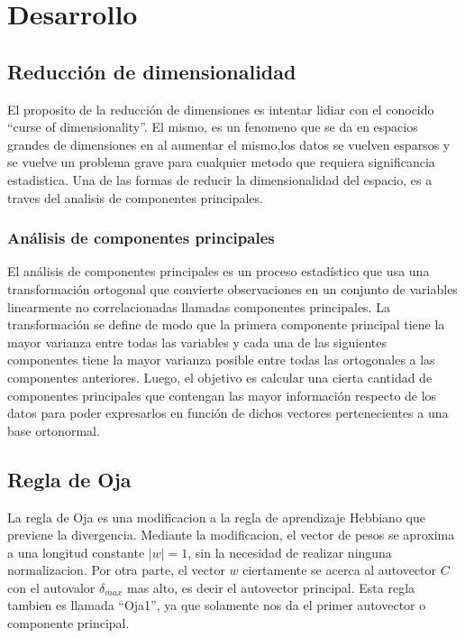 \documentclass[informe.tex]{subfiles}
\begin{document}
  
  \section{Desarrollo}
    \subsection{Reducción de dimensionalidad}
	El proposito de la reducción de dimensiones es intentar lidiar con el conocido ``curse of dimensionality''. El mismo, es un fenomeno que se da en espacios grandes de dimensiones en al aumentar el mismo,los datos se vuelven esparsos y se vuelve un problema grave para cualquier metodo que requiera significancia estadistica. Una de las formas de reducir la dimensionalidad del espacio, es a traves del analisis de componentes principales.
    
      \subsubsection{Análisis de componentes principales}
	El an\'alisis de componentes principales es un proceso estadístico que usa una transformaci\'on ortogonal que convierte observaciones en un conjunto de variables linearmente no correlacionadas llamadas componentes principales. La transformación se define de modo que la primera componente principal tiene la mayor varianza entre todas las variables y cada una de las siguientes componentes tiene la mayor varianza posible entre todas las ortogonales a las componentes anteriores. Luego, el objetivo es calcular una cierta cantidad de componentes principales que contengan las mayor información respecto de los datos para poder expresarlos en función de dichos vectores pertenecientes a una base ortonormal.
	
      \subsection{Regla de Oja}
	La regla de Oja es una modificacion a la regla de aprendizaje Hebbiano que previene la divergencia. Mediante la modificacion, el vector de pesos se aproxima a una longitud constante $|w|=1$, sin la necesidad de realizar ninguna normalizacion. Por otra parte, el vector $w$ ciertamente se acerca al autovector $C$ con el autovalor $\delta_{max}$ mas alto, es decir el autovector principal. Esta regla tambien es llamada ``Oja1'', ya que solamente nos da el primer autovector o componente principal.
	
	~
	
\end{document}

